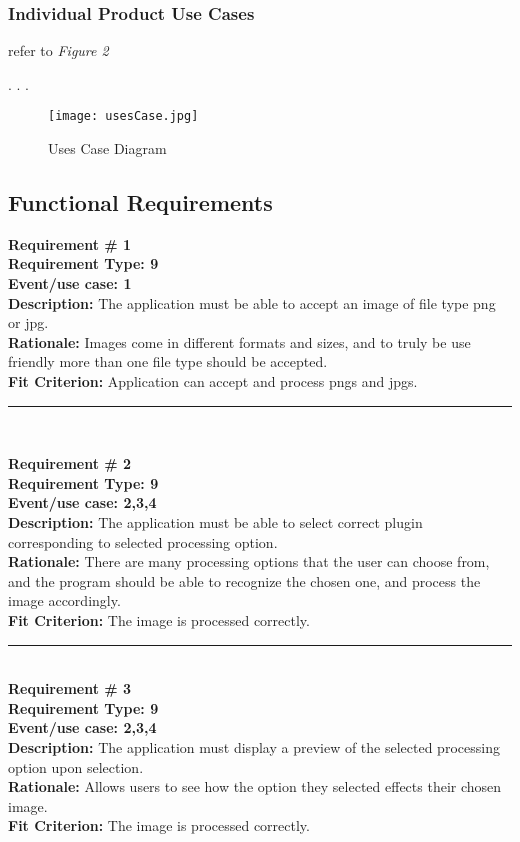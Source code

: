 \documentclass[12pt, titlepage]{article}
\begin{document}
	
	\newpage



\subsubsection{Individual Product Use Cases}
refer to \textit{Figure 2}

. . .

\begin{figure}[h]
	\texttt{[image: usesCase.jpg]}
	\caption{Uses Case Diagram}
	\end{figure}


\subsection{Functional Requirements}

	\textbf{Requirement \# 1}\\
	\textbf{Requirement Type:  9}\\
	\textbf{Event/use case: 1}\\
	\textbf{Description:} The application must be able to accept an image of file type png or jpg.\\
	\textbf{Rationale:} Images come in different formats and sizes, and to truly be use friendly more than one file type should be accepted.\\
	\textbf{Fit Criterion:} Application can accept and process pngs and jpgs.

	\noindent\rule{12cm}{0.4pt} \\ 
	
	\newpage

	\noindent\textbf{Requirement \# 2}\\
	\textbf{Requirement Type: 9}\\
	\textbf{Event/use case: 2,3,4}\\
	\textbf{Description:} The application must be able to select correct plugin corresponding to selected processing option.\\
	\textbf{Rationale:} There are many processing options that the user can choose from, and the program should be able to recognize the chosen one, and process the image accordingly. \\
	\textbf{Fit Criterion:} The image is processed correctly.

	\noindent\rule{12cm}{0.4pt} \\

	\noindent\textbf{Requirement \# 3}\\
	\textbf{Requirement Type: 9}\\
	\textbf{Event/use case: 2,3,4}\\
	\textbf{Description:} The application must display a preview of the selected processing option upon selection.\\
	\textbf{Rationale:} Allows users to see how the option they selected effects their chosen image.\\
	\textbf{Fit Criterion:} The image is processed correctly.\\
\end{document}
